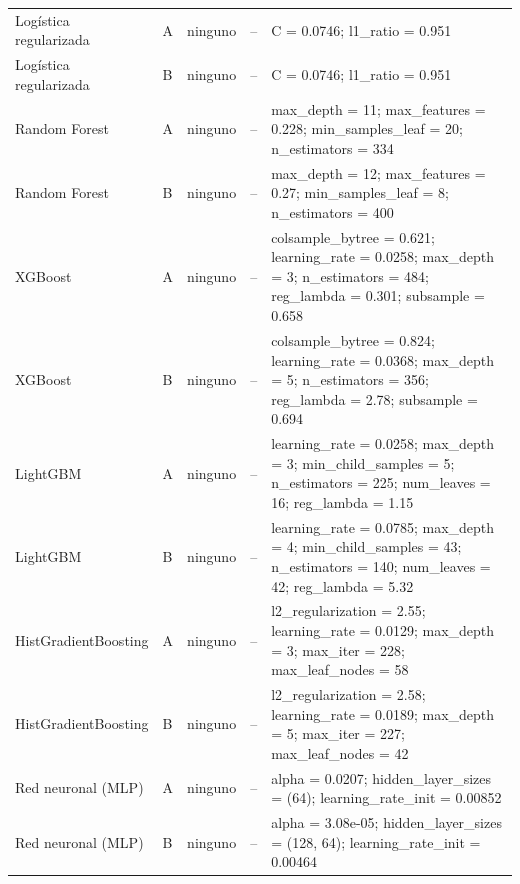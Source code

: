 \begin{longtable}{>{\raggedright\arraybackslash}p{}l l c>{\raggedright\arraybackslash}p{}}
  Logística regularizada & A & ninguno & -- & C = 0.0746; l1\_ratio = 0.951 \\
  Logística regularizada & B & ninguno & -- & C = 0.0746; l1\_ratio = 0.951 \\
  Random Forest & A & ninguno & -- & max\_depth = 11; max\_features = 0.228; min\_samples\_leaf = 20; n\_estimators = 334 \\
  Random Forest & B & ninguno & -- & max\_depth = 12; max\_features = 0.27; min\_samples\_leaf = 8; n\_estimators = 400 \\
  XGBoost & A & ninguno & -- & colsample\_bytree = 0.621; learning\_rate = 0.0258; max\_depth = 3; n\_estimators = 484; reg\_lambda = 0.301; subsample = 0.658 \\
  XGBoost & B & ninguno & -- & colsample\_bytree = 0.824; learning\_rate = 0.0368; max\_depth = 5; n\_estimators = 356; reg\_lambda = 2.78; subsample = 0.694 \\
  LightGBM & A & ninguno & -- & learning\_rate = 0.0258; max\_depth = 3; min\_child\_samples = 5; n\_estimators = 225; num\_leaves = 16; reg\_lambda = 1.15 \\
  LightGBM & B & ninguno & -- & learning\_rate = 0.0785; max\_depth = 4; min\_child\_samples = 43; n\_estimators = 140; num\_leaves = 42; reg\_lambda = 5.32 \\
  HistGradientBoosting & A & ninguno & -- & l2\_regularization = 2.55; learning\_rate = 0.0129; max\_depth = 3; max\_iter = 228; max\_leaf\_nodes = 58 \\
  HistGradientBoosting & B & ninguno & -- & l2\_regularization = 2.58; learning\_rate = 0.0189; max\_depth = 5; max\_iter = 227; max\_leaf\_nodes = 42 \\
  Red neuronal (MLP) & A & ninguno & -- & alpha = 0.0207; hidden\_layer\_sizes = (64); learning\_rate\_init = 0.00852 \\
  Red neuronal (MLP) & B & ninguno & -- & alpha = 3.08e-05; hidden\_layer\_sizes = (128, 64); learning\_rate\_init = 0.00464 \\
\end{longtable}
